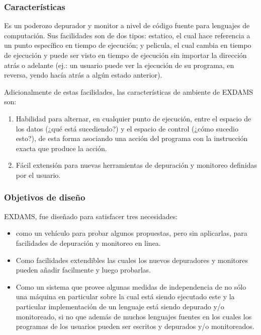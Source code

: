 \documentclass[12pt,a4paper]{report}
\begin{document}
			\subsubsection{Características}

Es un poderozo depurador y monitor a nivel de código fuente para lenguajes de computación.  Sus facilidades son de dos tipos: estatico, el cual hace referencia a un punto específico en tiempo de ejecución; y pelicula, el cual cambia en tiempo de ejecución y puede ser visto en tiempo de ejecución sin importar la dirección atrás o adelante (ej.: un usuario puede ver la ejecución de su programa, en reversa, yendo hacía atrás a algún estado anterior).

Adicionalmente de estas facilidades, las características de ambiente de EXDAMS son:
\begin{enumerate}
	\item Habilidad para alternar, en cualquier punto de ejecución, entre el espacio de los datos (¿qué está sucediendo?) y el espacio de control (¿cómo sucedio esto?), de esta forma asociando una acción del programa con la instrucción exacta que produce la acción.

	\item Fácil extensión para nuevas herramientas de depuración y monitoreo definidas por el usuario.
\end{enumerate} 

			\subsubsection{Objetivos de diseño}

EXDAMS, fue diseñado para satisfacer tres necesidades:
\begin{itemize}
	\item como un vehículo para probar algunos propuestas, pero sin aplicarlas, para facilidades de depuración y monitoreo en linea.

	\item Como facilidades extendibles las cuales los nuevos depuradores y monitores pueden añadir facilmente y luego probarlas.

	\item Como un sistema que provee algunas medidas de independencia de no sólo una máquina en particular sobre la cual está siendo ejecutado este y la particular implementación de un lenguaje está siendo depurado y/o monitoreado, si no que además de muchos lenguajes fuentes en los cuales los programas de los usuarios pueden ser escritos y depurados y/o monitoreados.
\end{itemize}
\end{document}
